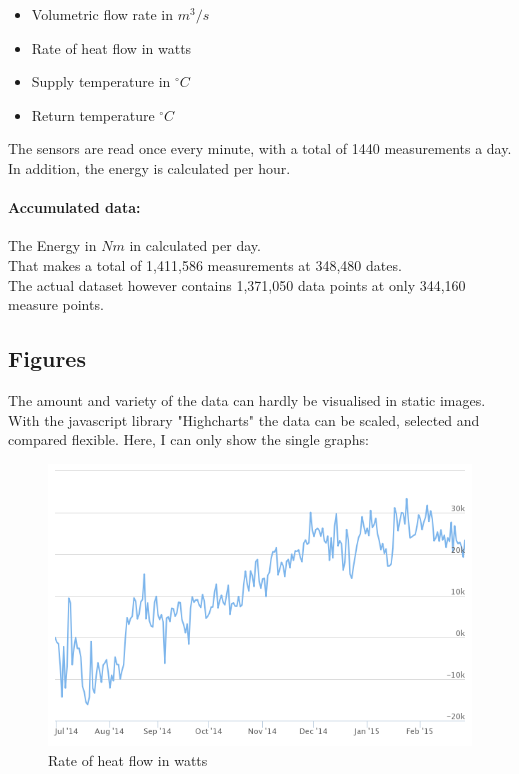\documentclass{scrartcl}
\begin{document}
\begin{itemize}
\item Volumetric flow rate in $m^3 / s$
\item Rate of heat flow in watts
\item Supply temperature in $^\circ C$
\item Return temperature $^\circ C$
\end{itemize}

The sensors are read once every minute, with a total of 1440 measurements a day. In addition, the energy is calculated per hour.\\

\paragraph{Accumulated data:}
The Energy in $Nm$ in calculated per day.\\

\noindent
That makes a total of 1,411,586 measurements at 348,480 dates.\\
The actual dataset however contains 1,371,050 data points at only 344,160 measure points.

\subsection{Figures}
The amount and variety of the data can hardly be visualised in static images. With the javascript library "Highcharts" the data can be scaled, selected and compared flexible. Here, I can only show the single graphs:

\begin{figure}[H]
  \centering
  \includegraphics[width=0.8\linewidth]{img/Leistung.png}
  \caption{Rate of heat flow in watts}
\end{figure}
\end{document}
